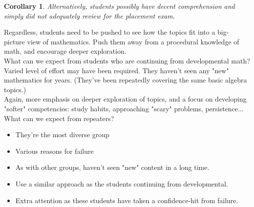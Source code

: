 \documentclass{ximera}
\newtheorem{corollary}[theorem]{Corollary}
\begin{document}
\begin{corollary}
Alternatively, students possibly have decent comprehension and simply did not 
adequately review for the placement exam. \\
\end{corollary}

Regardless, students need to be pushed to see how the topics fit into a big-
picture view of mathematics. Push them away from a procedural knowledge of
math, and encourage deeper exploration.\\


What can we expect from students who are continuing from developmental math? \\

Varied level of effort may have been required. They haven't seen any "new" 
mathematics for years. (They've been repeatedly covering the same basic algebra
topics.)\\

Again, more emphasis on deeper exploration of topics, and a focus on developing
"softer" competencies: study habits, approaching "scary" problems, persistence...\\


What can we expect from repeaters?\\
\begin{itemize}
\item They're the most diverse group
\item Various reasons for failure
\item As with other groups, haven't seen "new" content in a long time.
\item Use a similar approach as the students continuing from developmental.
\item Extra attention as these students have taken a confidence-hit from failure.
\end{itemize}
\end{document}
